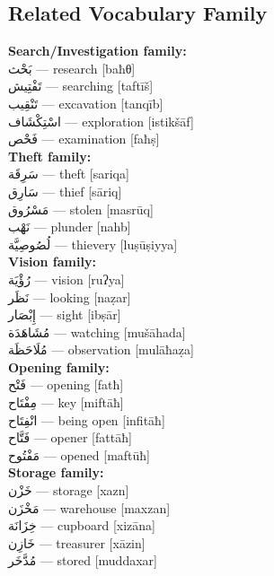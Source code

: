 \documentclass[letter,12pt]{article}
\begin{document}
\subsection{Related Vocabulary Family}
\begin{multicols}{2}

\textbf{Search/Investigation family:}\\
\textarabic{بَحْث} — research [baħθ]\\
\textarabic{تَفْتِيش} — searching [taftīš]\\
\textarabic{تَنْقِيب} — excavation [tanqīb]\\
\textarabic{اسْتِكْشَاف} — exploration [istikšāf]\\
\textarabic{فَحْص} — examination [faħṣ]\\

\textbf{Theft family:}\\
\textarabic{سَرِقَة} — theft [sariqa]\\
\textarabic{سَارِق} — thief [sāriq]\\
\textarabic{مَسْرُوق} — stolen [masrūq]\\
\textarabic{نَهْب} — plunder [nahb]\\
\textarabic{لُصُوصِيَّة} — thievery [luṣūṣiyya]\\

\textbf{Vision family:}\\
\textarabic{رُؤْيَة} — vision [ruʔya]\\
\textarabic{نَظَر} — looking [naẓar]\\
\textarabic{إِبْصَار} — sight [ibṣār]\\
\textarabic{مُشَاهَدَة} — watching [mušāhada]\\
\textarabic{مُلَاحَظَة} — observation [mulāħaẓa]\\

\textbf{Opening family:}\\
\textarabic{فَتْح} — opening [fatħ]\\
\textarabic{مِفْتَاح} — key [miftāħ]\\
\textarabic{انْفِتَاح} — being open [infitāħ]\\
\textarabic{فَتَّاح} — opener [fattāħ]\\
\textarabic{مَفْتُوح} — opened [maftūħ]\\

\textbf{Storage family:}\\
\textarabic{خَزْن} — storage [xazn]\\
\textarabic{مَخْزَن} — warehouse [maxzan]\\
\textarabic{خِزَانَة} — cupboard [xizāna]\\
\textarabic{خَازِن} — treasurer [xāzin]\\
\textarabic{مُدَّخَر} — stored [muddaxar]\\


\end{multicols}
\end{document}
